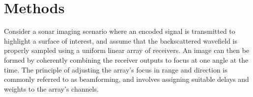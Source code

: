 


\section{Methods}\label{I_methods}

Consider a sonar imaging scenario where an encoded signal is transmitted to highlight a surface of interest, and assume that the backscattered wavefield is properly sampled using a uniform linear array of receivers. An image can then be formed by coherently combining the receiver outputs to focus at one angle at the time. The principle of adjusting the array's focus in range and direction is commonly referred to as beamforming, and involves assigning suitable delays and weights to the array's channels.


